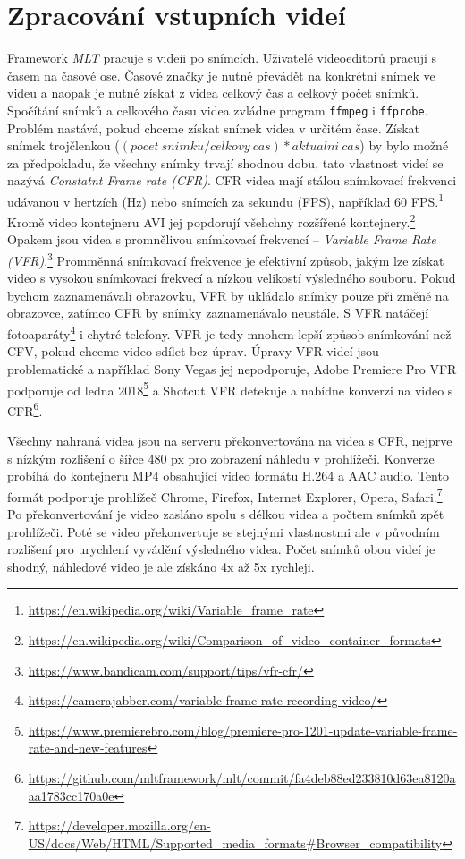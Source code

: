 \section{Zpracování vstupních videí}
Framework \textit{MLT} pracuje s videii po snímcích. Uživatelé videoeditorů pracují s časem na časové ose. Časové značky je nutné převádět na konkrétní snímek ve videu a naopak je nutné získat z videa celkový čas a celkový počet snímků. Spočítání snímků a celkového času videa zvládne program \texttt{ffmpeg} i \texttt{ffprobe}. Problém nastává, pokud chceme získat snímek videa v určitém čase. Získat snímek trojčlenkou ($ (pocet\ snimku / celkovy\ cas) * aktualni\ cas $) by bylo možné za předpokladu, že všechny snímky trvají shodnou dobu, tato vlastnost videí se nazývá \textit{Constatnt Frame rate (CFR)}. CFR videa mají stálou snímkovací frekvenci udávanou v hertzích (Hz) nebo snímcích za sekundu (FPS), například 60 FPS.\footnote{\url{https://en.wikipedia.org/wiki/Variable_frame_rate}} Kromě video kontejneru AVI jej popdorují všehchny rozšířené kontejnery.\footnote{\url{https://en.wikipedia.org/wiki/Comparison_of_video_container_formats}} Opakem jsou videa s promnělivou snímkovací frekvencí -- \textit{Variable Frame Rate (VFR)}.\footnote{\url{https://www.bandicam.com/support/tips/vfr-cfr/}} Promměnná snímkovací frekvence je efektivní způsob, jakým lze získat video s vysokou snímkovací frekvecí a nízkou velikostí výsledného souboru. Pokud bychom zaznamenávali obrazovku, VFR by ukládalo snímky pouze při změně na obrazovce, zatímco CFR by snímky zaznamenávalo neustále. S VFR natáčejí fotoaparáty\footnote{\url{https://camerajabber.com/variable-frame-rate-recording-video/}} i chytré telefony. VFR je tedy mnohem lepší způsob snímkování než CFV, pokud chceme video sdílet bez úprav. Úpravy VFR videí jsou problematické a například Sony Vegas jej nepodporuje, Adobe Premiere Pro VFR podporuje od ledna 2018\footnote{\url{https://www.premierebro.com/blog/premiere-pro-1201-update-variable-frame-rate-and-new-features}} a Shotcut VFR detekuje a nabídne konverzi na video s CFR\footnote{\url{https://github.com/mltframework/mlt/commit/fa4deb88ed233810d63ea8120aaa1783cc170a0e}}.

Všechny nahraná videa jsou na serveru překonvertována na videa s CFR, nejprve s nízkým rozlišení o šířce 480 px pro zobrazení náhledu v prohlížeči. Konverze probíhá do kontejneru MP4 obsahující video formátu H.264 a AAC audio. Tento formát podporuje prohlížeč Chrome, Firefox, Internet Explorer, Opera, Safari.\footnote{\url{https://developer.mozilla.org/en-US/docs/Web/HTML/Supported_media_formats\#Browser_compatibility}} Po překonvertování je video zasláno spolu s délkou videa a počtem snímků zpět prohlížeči. Poté se video překonvertuje se stejnými vlastnostmi ale v původním rozlišení pro urychlení vyvádění výsledného videa. Počet snímků obou videí je shodný, náhledové video je ale získáno 4x až 5x rychleji.

